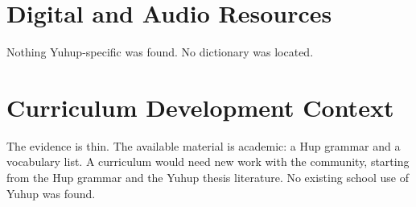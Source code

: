 \documentclass[12pt]{article}
\begin{document}
\section{Digital and Audio Resources}
Nothing Yuhup-specific was found. No dictionary was located.

\section{Curriculum Development Context}
The evidence is thin. The available material is academic: a Hup grammar and a vocabulary list. A curriculum would need new work with the community, starting from the Hup grammar and the Yuhup thesis literature. No existing school use of Yuhup was found.
\end{document}
